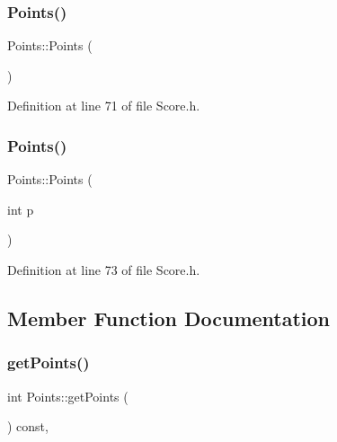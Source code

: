 \subsubsection{\texorpdfstring{Points()}{Points()}\hspace{0.1cm}{\footnotesize\ttfamily [1/2]}}
{\footnotesize\ttfamily Points\+::\+Points (\begin{DoxyParamCaption}{ }\end{DoxyParamCaption})\hspace{0.3cm}{\ttfamily [inline]}}



Definition at line 71 of file Score.\+h.

\hypertarget{class_points_a371350e3342fdf8604fbae49bce96664}{}\label{class_points_a371350e3342fdf8604fbae49bce96664} 
\subsubsection{\texorpdfstring{Points()}{Points()}\hspace{0.1cm}{\footnotesize\ttfamily [2/2]}}
{\footnotesize\ttfamily Points\+::\+Points (\begin{DoxyParamCaption}\item[{int}]{p }\end{DoxyParamCaption})\hspace{0.3cm}{\ttfamily [inline]}}



Definition at line 73 of file Score.\+h.



\subsection{Member Function Documentation}
\hypertarget{class_points_a0bcaad8a1ad4a694fb83200eec97c9ce}{}\label{class_points_a0bcaad8a1ad4a694fb83200eec97c9ce} 
\subsubsection{\texorpdfstring{get\+Points()}{getPoints()}}
{\footnotesize\ttfamily int Points\+::get\+Points (\begin{DoxyParamCaption}{ }\end{DoxyParamCaption}) const\hspace{0.3cm}{\ttfamily [inline]}, {\ttfamily [virtual]}}



